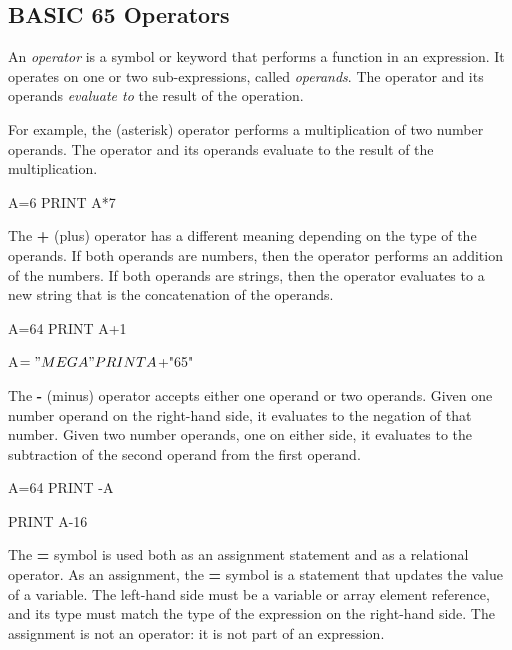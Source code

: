 \subsection{BASIC 65 Operators}

An {\em operator} is a symbol or keyword that performs a function in an
expression. It operates on one or two sub-expressions, called {\em operands}.
The operator and its operands {\em evaluate to} the result of the operation.

For example, the {\bf *} (asterisk) operator performs a multiplication of two
number operands. The operator and its operands evaluate to the result of the
multiplication.

\begin{screencode}
A=6
PRINT A*7
\end{screencode}

The {\bf +} (plus) operator has a different meaning depending on the type of
the operands. If both operands are numbers, then the operator performs an
addition of the numbers. If both operands are strings, then the operator
evaluates to a new string that is the concatenation of the operands.

\begin{screencode}
A=64
PRINT A+1

A$="MEGA"
PRINT A$+"65"
\end{screencode}

The {\bf -} (minus) operator accepts either one operand or two operands. Given
one number operand on the right-hand side, it evaluates to the negation of
that number. Given two number operands, one on either side, it evaluates to
the subtraction of the second operand from the first operand.

\begin{screencode}
A=64
PRINT -A

PRINT A-16
\end{screencode}

The {\bf =} symbol is used both as an assignment statement and as a relational
operator. As an assignment, the {\bf =} symbol is a statement that updates the
value of a variable. The left-hand side must be a variable or array element
reference, and its type must match the type of the expression on the
right-hand side. The assignment is not an operator: it is not part of an
expression.


